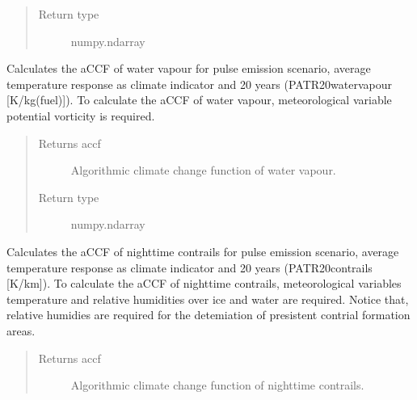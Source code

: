 \documentclass[a4paper,11pt,english]{sphinxmanual}
\begin{document}
\begin{fulllineitems}
\begin{fulllineitems}
\begin{quote}
\begin{description}
\item[{Return type}] \leavevmode
\sphinxAtStartPar
numpy.ndarray

\end{description}\end{quote}

\end{fulllineitems}


\begin{fulllineitems}
\label{\detokenize{envlib:envlib.accf.CalAccf.accf_h2o}}
\sphinxAtStartPar
Calculates the aCCF of water vapour for pulse emission scenario, average temperature response as
climate indicator and 20 years (P\sphinxhyphen{}ATR20\sphinxhyphen{}water\sphinxhyphen{}vapour {[}K/kg(fuel){]}). To calculate the aCCF of water vapour,
meteorological variable potential vorticity is required.
\begin{quote}\begin{description}
\item[{Returns accf}] \leavevmode
\sphinxAtStartPar
Algorithmic climate change function of water vapour.

\item[{Return type}] \leavevmode
\sphinxAtStartPar
numpy.ndarray

\end{description}\end{quote}

\end{fulllineitems}


\begin{fulllineitems}
\label{\detokenize{envlib:envlib.accf.CalAccf.accf_ncontrail}}
\sphinxAtStartPar
Calculates the aCCF of night\sphinxhyphen{}time contrails for pulse emission scenario, average temperature response as
climate indicator and 20 years (P\sphinxhyphen{}ATR20\sphinxhyphen{}contrails {[}K/km{]}). To calculate the aCCF of nighttime contrails,
meteorological variables temperature and relative humidities over ice and water are required. Notice that,
relative humidies are required for the detemiation of presistent contrial formation areas.
\begin{quote}\begin{description}
\item[{Returns accf}] \leavevmode
\sphinxAtStartPar
Algorithmic climate change function of nighttime contrails.


\end{description}
\end{quote}
\end{fulllineitems}
\end{fulllineitems}
\end{document}
